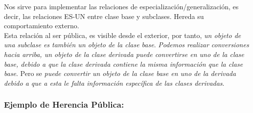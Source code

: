 Nos sirve para implementar las relaciones de especialización/generalización, es decir, las relaciones ES-UN entre clase base y subclases.
Hereda su comportamiento externo.\\

Esta relación al ser pública, es visible desde el exterior, por tanto, \textit{un objeto de una subclase es también un objeto de la clase base}.
\textit{Podemos realizar conversiones hacia arriba, un objeto de la clase derivada puede convertirse en uno de la clase base, debido a que la clase derivada contiene la misma información que la clase base}.
Pero  se \textit{puede convertir un objeto de la clase base en uno de la derivada debido a que a esta le falta información específica de las clases derivadas}.

\newpage
\subsubsection{Ejemplo de Herencia Pública:}


